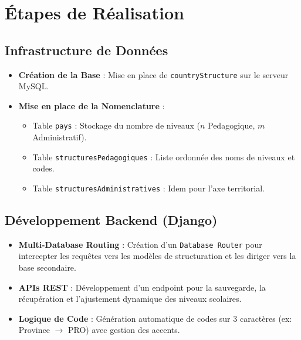 \documentclass[12pt,a4paper]{article}
\begin{document}
\section{\'Etapes de R\'ealisation}

\subsection{Infrastructure de Donn\'ees}
\begin{itemize}
    \item \textbf{Cr\'eation de la Base} : Mise en place de \texttt{countryStructure} sur le serveur MySQL.
    \item \textbf{Mise en place de la Nomenclature} :
    \begin{itemize}
        \item Table \texttt{pays} : Stockage du nombre de niveaux ($n$ Pedagogique, $m$ Administratif).
        \item Table \texttt{structuresPedagogiques} : Liste ordonnée des noms de niveaux et codes.
        \item Table \texttt{structuresAdministratives} : Idem pour l'axe territorial.
    \end{itemize}
\end{itemize}

\subsection{D\'eveloppement Backend (Django)}
\begin{itemize}
    \item \textbf{Multi-Database Routing} : Création d'un \texttt{Database Router} pour intercepter les requêtes vers les modèles de structuration et les diriger vers la base secondaire.
    \item \textbf{APIs REST} : Développement d'un endpoint pour la sauvegarde, la récupération et l'ajustement dynamique des niveaux scolaires.
    \item \textbf{Logique de Code} : G\'en\'eration automatique de codes sur 3 caractères (ex: Province $\to$ PRO) avec gestion des accents.
\end{itemize}
\end{document}
